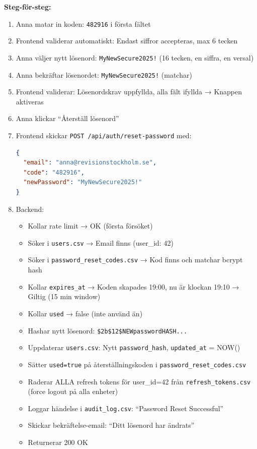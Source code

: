 \documentclass[12pt,a4paper]{article}
\begin{document}
\textbf{Steg-för-steg:}
\begin{enumerate}[noitemsep]
  \item Anna matar in koden: \texttt{482916} i första fältet
  \item Frontend validerar automatiskt: Endast siffror accepteras, max 6 tecken
  \item Anna väljer nytt lösenord: \texttt{MyNewSecure2025!} (16 tecken, en siffra, en versal)
  \item Anna bekräftar lösenordet: \texttt{MyNewSecure2025!} (matchar)
  \item Frontend validerar: Lösenordskrav uppfyllda, alla fält ifyllda → Knappen aktiveras
  \item Anna klickar ``Återställ lösenord''
  \item Frontend skickar \texttt{POST /api/auth/reset-password} med:
  \begin{lstlisting}[language=json]
{
  "email": "anna@revisionstockholm.se",
  "code": "482916",
  "newPassword": "MyNewSecure2025!"
}
  \end{lstlisting}
  \item Backend:
  \begin{itemize}[noitemsep]
    \item Kollar rate limit → OK (första försöket)
    \item Söker i \texttt{users.csv} → Email finns (user\_id: 42)
    \item Söker i \texttt{password\_reset\_codes.csv} → Kod finns och matchar bcrypt hash
    \item Kollar \texttt{expires\_at} → Koden skapades 19:00, nu är klockan 19:10 → Giltig (15 min window)
    \item Kollar \texttt{used} → false (inte använd än)
    \item Hashar nytt lösenord: \texttt{\$2b\$12\$NEWpasswordHASH...}
    \item Uppdaterar \texttt{users.csv}: Nytt \texttt{password\_hash}, \texttt{updated\_at} = NOW()
    \item Sätter \texttt{used=true} på återställningskoden i \texttt{password\_reset\_codes.csv}
    \item Raderar ALLA refresh tokens för user\_id=42 från \texttt{refresh\_tokens.csv} (force logout på alla enheter)
    \item Loggar händelse i \texttt{audit\_log.csv}: ``Password Reset Successful''
    \item Skickar bekräftelse-email: ``Ditt lösenord har ändrats''
    \item Returnerar 200 OK

\end{itemize}
\end{enumerate}
\end{document}
